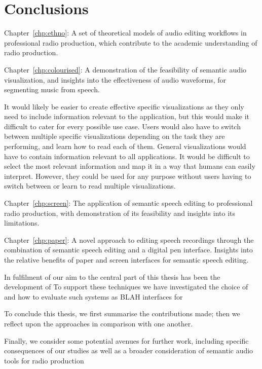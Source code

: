 \chapter{Conclusions}\label{chp:conclusions}


Chapter~\ref{chp:ethno}: A set of theoretical models of audio editing workflows in professional radio production, which
contribute to the academic understanding of radio production.

Chapter~\ref{chp:colourised}: A demonstration of the feasibility of semantic audio visualization, and insights into the
effectiveness of audio waveforms, for segmenting music from speech.

It would likely be easier to create effective specific visualizations as they
only need to include information relevant to the application, but this would make it difficult to cater for every
possible use case. Users would also have to switch between multiple specific visualizations depending on the task they
are performing, and learn how to read each of them. General visualizations would have to contain information relevant
to all applications. It would be difficult to select the most relevant information and map it in a way that humans can
easily interpret. However, they could be used for any purpose without users having to switch between or learn to read
multiple visualizations.


Chapter~\ref{chp:screen}: The application of semantic speech editing to professional radio production, with
demonstration of its feasibility and insights into its limitations. 

Chapter~\ref{chp:paper}: A novel approach to editing speech recordings through the combination of semantic speech
editing and a digital pen interface. Insights into the relative benefits of paper and screen interfaces for semantic
speech editing.


In fulfilment of our aim to
the central part of this thesis has been the development of
To support these techniques we have investigated the choice of
and how to evaluate such systems as BLAH interfaces for 

To conclude this thesis, we first summarise the contributions made; then we reflect upon the approaches in comparison
with one another.

Finally, we consider some potential avenues for further work, including specific consequences of our studies as well as
a broader consideration of semantic audio tools for radio production





